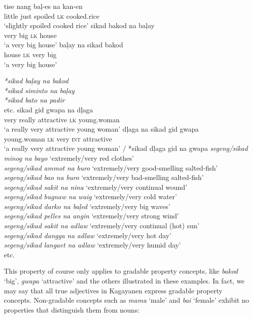 \ea
\label{bkm:Ref441658460}
\gll tise  nang  baļ{}-es  na  kan-en \\
little  just  spoiled  \textsc{lk}  cooked.rice \\
\glt ‘slightly spoiled cooked rice’
\z
\ea
\gll sikad  bakod  na  baļay \\
very  big  \textsc{lk}  house \\
\glt ‘a very big house’
\z
\ea
\gll baļay  na  sikad  bakod \\
house  \textsc{lk}  very  big \\
\glt ‘a very big house’ \\\smallskip

\textit{*sikad baļay na bakod \\
*sikad siminto na baļay \\
*sikad bato na padir} \\
  etc.
\z
\ea
\gll sikad gid  gwapa  na  dļaga \\
very  really  attractive  \textsc{lk}  young.woman \\
\glt ‘a really very attractive young woman’
\z
\ea
\gll dļaga  na  sikad  gid  gwapa \\
young.woman  \textsc{lk}  very \textsc{int}  attractive \\ 
\glt ‘a really very attractive young woman’ / *sikad dļaga gid na gwapa
\z
\ea
\textit{segeng/sikad minog na bayo} ‘extremely/very red clothes’ \\
\textit{segeng/sikad ammot na buro}  ‘extremely/very good-smelling salted-fish’ \\
\textit{segeng/sikad bao na buro}  ‘extremely/very bad-smelling salted-fish’ \\
\textit{segeng/sikad sakit na nina}  ‘extremely/very continual wound’ \\
\textit{segeng/sikad bugnaw na waig}  ‘extremely/very cold water’ \\
\textit{segeng/sikad darko na baļed}   ‘extremely/very big waves’ \\
\textit{segeng/sikad pelles na angin}  ‘extremely/very strong wind’ \\
\textit{segeng/sikad sakit na adlaw}  ‘extremely/very continual (hot) sun’ \\
\textit{segeng/sikad dangga na adlaw}  ‘extremely/very hot day’ \\
\textit{segeng/sikad langaet na adlaw}  ‘extremely/very humid day’ \\
etc.
\z

This property of course only applies to gradable property concepts, like \textit{bakod} ‘big’, \textit{gwapa} ‘attractive’ and the others illustrated in these examples. In fact, we may say that all true adjectives in Kagayanen express gradable property concepts. Non-gradable concepts such as \textit{mama} ‘male’ and \textit{bai} ‘female’ exhibit no properties that distinguish them from nouns:

